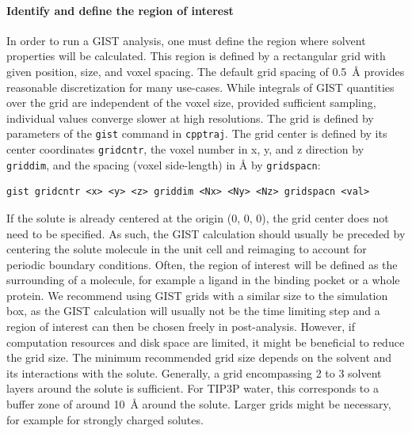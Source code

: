 \documentclass[9pt,tutorial]{livecoms}
\newcommand{\software}{\texttt}
\newcommand\inlinecode{\texttt}
\begin{document}
\paragraph{Identify and define the region of interest}
In order to run a GIST analysis, one must define the region where solvent properties will be calculated.
This region is defined by a rectangular grid with given position, size, and voxel spacing.
The default grid spacing of \qty{0.5}{\angstrom} provides reasonable discretization for many use-cases.
While integrals of GIST quantities over the grid are independent of the voxel size, provided sufficient sampling, individual values converge slower at high resolutions.
The grid is defined by parameters of the \inlinecode{gist} command in \software{cpptraj}.
The grid center is defined by its center coordinates \inlinecode{gridcntr}, the voxel number in x, y, and z direction by \inlinecode{griddim}, and the spacing (voxel side-length) in \AA{} by \inlinecode{gridspacn}:

\begin{lstlisting}[style=cpptraj]
gist gridcntr <x> <y> <z> griddim <Nx> <Ny> <Nz> gridspacn <val>
\end{lstlisting}
If the solute is already centered at the origin (0, 0, 0), the grid center does not need to be specified.
As such, the GIST calculation should usually be preceded by centering the solute molecule in the unit cell and reimaging to account for periodic boundary conditions.
Often, the region of interest will be defined as the surrounding of a molecule, for example a ligand in the binding pocket or a whole protein. 
We recommend using GIST grids with a similar size to the simulation box, as the GIST calculation will usually not be the time limiting step and a region of interest can then be chosen freely in post-analysis.
However, if computation resources and disk space are limited, it might be beneficial to reduce the grid size.
The minimum recommended grid size depends on the solvent and its interactions with the solute.
Generally, a grid encompassing 2 to 3 solvent layers around the solute is sufficient. 
For TIP3P water, this corresponds to a buffer zone of around \qty{10}{\angstrom} around the solute. 
Larger grids might be necessary, for example for strongly charged solutes.
\end{document}
